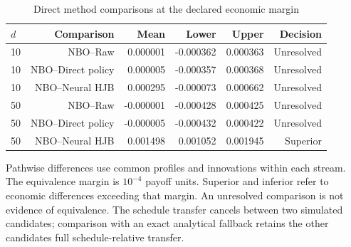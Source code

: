 \begin{table}[!htbp]
\centering\small
\caption{Direct method comparisons at the declared economic margin}
\label{tab:r15methodcontrasts}
\begin{tabular}{lrrrrr}
\toprule
$d$ & Comparison & Mean & Lower & Upper & Decision \\
\midrule
10 & NBO--Raw & 0.000001 & -0.000362 & 0.000363 & Unresolved \\
10 & NBO--Direct policy & 0.000005 & -0.000357 & 0.000368 & Unresolved \\
10 & NBO--Neural HJB & 0.000295 & -0.000073 & 0.000662 & Unresolved \\
50 & NBO--Raw & -0.000001 & -0.000428 & 0.000425 & Unresolved \\
50 & NBO--Direct policy & -0.000005 & -0.000432 & 0.000422 & Unresolved \\
50 & NBO--Neural HJB & 0.001498 & 0.001052 & 0.001945 & Superior \\
\bottomrule
\end{tabular}
\par\medskip\noindent\footnotesize Pathwise differences use common profiles and innovations within each stream. The equivalence margin is $10^{-4}$ payoff units. Superior and inferior refer to economic differences exceeding that margin. An unresolved comparison is not evidence of equivalence. The schedule transfer cancels between two simulated candidates; comparison with an exact analytical fallback retains the other candidate\textquotesingle s full schedule-relative transfer.
\end{table}
